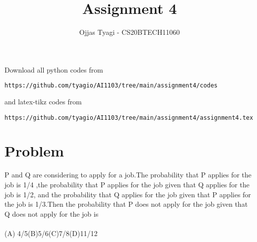 \documentclass[journal,12pt,twocolumn]{IEEEtran}
\begin{document}
\providecommand{\fourier}{\overset{\mathcal{F}}{ \rightleftharpoons}}
\providecommand{\system}{\overset{\mathcal{H}}{ \longleftrightarrow}}
\newcommand{\solution}{\noindent \textbf{Solution: }}
\newcommand{\cosec}{\,\text{cosec}\,}
\providecommand{\dec}[2]{\ensuremath{\overset{#1}{\underset{#2}{\gtrless}}}}
\newcommand{\myvec}[1]{\ensuremath{\begin{pmatrix}#1\end{pmatrix}}}
\newcommand{\mydet}[1]{\ensuremath{\begin{vmatrix}#1\end{vmatrix}}}
\makeatletter
{}
\makeatother
\let\StandardTheFigure\thefigure
\let\vec\mathbf
\renewcommand{\thefigure}{\theproblem}
\def\putbox#1#2#3{\makebox[0in][l]{\makebox[#1][l]{}\raisebox{\baselineskip}[0in][0in]{\raisebox{#2}[0in][0in]{#3}}}}
     \def\rightbox#1{\makebox[0in][r]{#1}}
     \def\centbox#1{\makebox[0in]{#1}}
     \def\topbox#1{\raisebox{-\baselineskip}[0in][0in]{#1}}
     \def\midbox#1{\raisebox{-0.5\baselineskip}[0in][0in]{#1}}
\vspace{3cm}
\title{Assignment 4}
\author{Ojjas Tyagi - CS20BTECH11060}
\maketitle
\newpage
\bigskip
\renewcommand{\thefigure}{\theenumi}
\renewcommand{\thetable}{\theenumi}
Download all python codes from 
\begin{lstlisting}
https://github.com/tyagio/AI1103/tree/main/assignment4/codes
\end{lstlisting}
%
and latex-tikz codes from 
%
\begin{lstlisting}
https://github.com/tyagio/AI1103/tree/main/assignment4/assignment4.tex
\end{lstlisting}
\section{Problem}
P and Q are considering to apply for a job.The probability that P applies for the job is 1/4 ,the probability that P applies for the job given that Q applies for the job is 1/2, and the probability that Q applies for the job given that P applies for the job is 1/3.Then the probability that P does not apply for the job given that Q does not apply for the job is\\ \\
(A) 4/5\quad\quad(B)5/6\quad\quad(C)7/8\quad\quad(D)11/12
\end{document}

